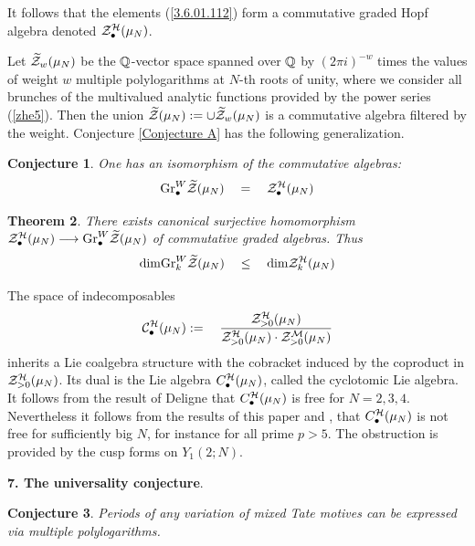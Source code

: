 \documentclass[10pt]{article}
\newtheorem{theorem}{Theorem}[section]
\newtheorem{conjecture}[theorem]{Conjecture}
\begin{document}
It follows that the elements (\ref{3.6.01.112}) 
form a commutative graded Hopf algebra denoted
${\cal Z}_{\bullet}^{\cal H}(\mu_N)$. 


Let $\widetilde {\cal Z}_w(\mu_N)$ be the ${\mathbb Q}$-vector space spanned over ${\mathbb Q}$ 
by $(2 \pi i)^{-w}$ times the values of weight $w$ 
multiple 
polylogarithms at $N$-th roots of unity, where we consider all  brunches of the 
multivalued analytic functions provided by the power series (\ref{zhe5}). 
Then the union $\widetilde {\cal Z}(\mu_N) := \cup \widetilde {\cal Z}_w(\mu_N)$ 
is a commutative algebra filtered by the weight. 
Conjecture \ref{Conjecture A} has the following generalization. 


\begin{conjecture} \label{th1.2} One has an isomorphism of the commutative algebras: 
$$  
{\rm Gr}^W_{\bullet}\widetilde {\cal Z}(\mu_N) \quad = \quad   {\cal
Z}^{\cal H}_{\bullet}(\mu_N)
$$
\end{conjecture}
 

 \begin{theorem} \label{th1.221} There exists canonical surjective homomorphism ${\cal Z}_{\bullet}^{\cal H}(\mu_N) \longrightarrow {\rm Gr}^W_{\bullet}\widetilde {\cal Z}(\mu_N)$ of commutative 
graded algebras. Thus 
$$  
{\rm dim} {\rm Gr}^W_{k}\widetilde {\cal Z}(\mu_N)  \quad \leq  \quad  {\rm dim} {\cal
Z}_{k}^{\cal H}(\mu_N)
$$
\end{theorem}


The space of indecomposables
$$%
 {\cal C}^{{\cal H}}_{\bullet}(\mu_N):= \quad 
\frac{{\cal Z}^{{\cal H}}_{>0}(\mu_N)}{
{\cal Z}^{{\cal H}}_{>0}(\mu_N) \cdot {\cal Z}^{{\cal M}}_{>0}(\mu_N)}
$$%
inherits a Lie coalgebra structure with the cobracket induced by the coproduct in 
${\cal Z}^{{\cal H}}_{>0}(\mu_N)$. Its dual is the Lie algebra 
${C}^{\cal H}_{\bullet}(\mu_N)$, called the cyclotomic Lie algebra. 
It follows from the result of Deligne \cite{D2,D3} 
that $C^{\cal H}_{\bullet}(\mu_N)$ is free 
for $N=2,3,4$. Nevertheless it follows from the results of this paper and \cite{G4}, \cite{G10} 
that $C^{\cal H}_{\bullet}(\mu_N)$ is not free for sufficiently big $N$,  for instance for 
all prime $p>5$. The  obstruction is provided by the cusp 
forms on $Y_1(2;N)$. 

 
{\bf 7. The universality conjecture}. 
\begin{conjecture} \label{1.4}  Periods of any variation of 
 mixed Tate motives can be expressed via multiple polylogarithms.
\end{conjecture}
\end{document}
